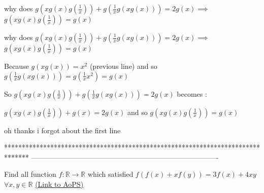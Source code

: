 \begin{solution}
	why does $ g(xg(x)g(\frac{1}{x}))+g(\frac{1}{x}g(xg(x)))=2g(x) $$ \implies $ $ g(xg(x)g(\frac{1}{x}))=g(x) $
\end{solution}



\begin{solution}
	\begin{tcolorbox}why does $ g(xg(x)g(\frac{1}{x}))+g(\frac{1}{x}g(xg(x)))=2g(x) $$ \implies $ $ g(xg(x)g(\frac{1}{x}))=g(x) $\end{tcolorbox}
Because $g(xg(x))=x^2$ (previous line)  and so $g(\frac{1}{x}g(xg(x)))=g(\frac{1}{x}x^2)=g(x)$

So $ g(xg(x)g(\frac{1}{x}))+g(\frac{1}{x}g(xg(x)))=2g(x) $ becomes :

$ g(xg(x)g(\frac{1}{x}))+g(x)=2g(x) $ and so $ g(xg(x)g(\frac{1}{x}))=g(x) $
\end{solution}



\begin{solution}
	oh thanks i forgot about the first line
\end{solution}
*******************************************************************************
-------------------------------------------------------------------------------

\begin{problem}
	Find all function $f :\mathbb{R} \rightarrow \mathbb{R}$ which satisfied $f(f(x)+xf(y))=3f(x)+4xy$ $\forall x,y \in \mathbb{R}$
	\flushright \href{https://artofproblemsolving.com/community/c6h479690}{(Link to AoPS)}
\end{problem}



